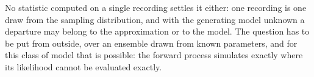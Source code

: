 No statistic computed on a single recording settles it either: one recording is one draw from the
sampling distribution, and with the generating model unknown a departure may belong to the
approximation or to the model. The question has to be put from outside, over an ensemble drawn from
known parameters, and for this class of model that is possible: the forward process simulates
exactly where its likelihood cannot be evaluated exactly.

